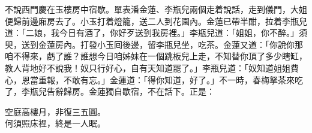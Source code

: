 不說西門慶在玉樓房中宿歇。單表潘金蓮、李瓶兒兩個走着說話，走到儀門，大姐便歸前邊廂房去了。小玉打着燈籠，送二人到花園內。金蓮已帶半酣，拉着李瓶兒道：「二娘，我今日有酒了，你好歹送到我房裡。」李瓶兒道：「姐姐，你不醉。」須臾，送到金蓮房內。打發小玉囘後邊，留李瓶兒坐，吃茶。金蓮又道：「你說你那咱不得來，虧了誰？誰想今日咱姊妹在一個跳板兒上走，不知替你頂了多少瞎缸，教人背地好不說我！奴只行好心，自有天知道罷了。」{}李瓶兒道：「奴知道姐姐費心，恩當重報，不敢有忘。」金蓮道：「得你知道，好了。」不一時，春梅拏茶來吃了，李瓶兒告辭歸房。金蓮獨自歇宿，不在話下。正是：

\begin{myquote} 
空庭高樓月，非復三五圓。\\何須照床裡，終是一人眠。
\end{myquote} 

